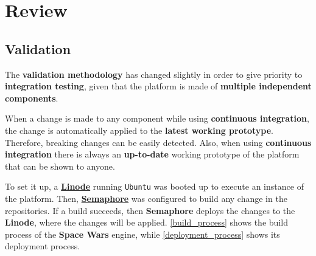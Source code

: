 \documentclass[a4paper,11pt,titlepage,abstract,numbers=noenddot,automark,mnsy,intlimits,rgb,dvipsnames]{report}
\begin{document}
\part{Review}
\chapter{Validation}
\label{methodology}
The \textbf{validation methodology} has changed slightly in order to give priority to \textbf{integration testing}, given that
the platform is made of \textbf{multiple independent components}.

When a change is made to any component while using \textbf{continuous integration}, the change is automatically applied to
the \textbf{latest working prototype}. Therefore, breaking changes can be easily detected. Also, when using  \textbf{continuous
integration} there is always an \textbf{up-to-date} working prototype of the platform that can be shown to anyone.

To set it up, a \href{http://linode.com/}{\textbf{Linode}} running \texttt{Ubuntu} was booted up to execute an instance of
the platform. Then, \href{http://semaphoreci.com/}{\textbf{Semaphore}} was configured to build any change in the
repositories. If a build succeeds, then \textbf{Semaphore} deploys the changes to the \textbf{Linode}, where the changes will
be applied. \autoref{build_process} shows the build process of the \textbf{Space Wars} engine, while
\autoref{deployment_process} shows its deployment process.
\end{document}
